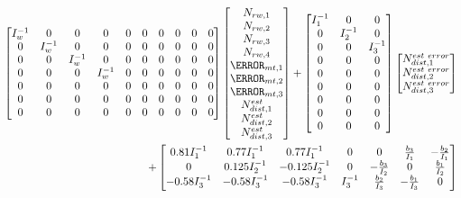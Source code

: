 \begin{align}
\begin{bmatrix}
I_w^{-1} & 0 & 0& 0 & 0 & 0 & 0 & 0 & 0 & 0 \\
0 & I_w^{-1} & 0& 0 & 0 & 0 & 0 & 0 & 0 & 0 \\ 
0 & 0 & I_w^{-1} & 0 & 0 & 0 & 0 & 0 & 0 & 0\\  
0 & 0 & 0 &  I_w^{-1} & 0& 0 & 0 & 0 & 0 & 0\\
0 & 0 & 0 & 0 & 0& 0 & 0 & 0 & 0 & 0\\
0 & 0 & 0 & 0 & 0& 0 & 0 & 0 & 0 & 0\\
0 & 0 & 0 & 0 & 0& 0 & 0 & 0 & 0 & 0
\end{bmatrix}
\begin{bmatrix}
N_{rw,1} \\
N_{rw,2} \\
N_{rw,3}\\
N_{rw,4}\\
\m_{mt,1} \\
\m_{mt,2} \\
\m_{mt,3} \\
N^{est}_{dist,1} \\
N^{est}_{dist,2} \\
N^{est}_{dist,3}
\end{bmatrix}
+
\begin{bmatrix}
I_1^{-1} & 0 & 0 \\
0 & I_2^{-1} & 0 \\
0 & 0 & I_3^{-1}\\
0 & 0 & 0 \\
0 & 0 & 0 \\
0 & 0 & 0 \\
0 & 0 & 0 \\
0 & 0 & 0 \\
0 & 0 & 0 
\end{bmatrix}
\begin{bmatrix}
N^{est \ error}_{dist,1} \\
N^{est \ error}_{dist,2} \\
N^{est \ error}_{dist,3}\\
\end{bmatrix}
 \\
 + 
 \begin{bmatrix}
0.81I_1^{-1} & 0.77I_1^{-1} & 0.77I_1^{-1} & 0 & 0 & \frac{b_3}{I_1} & -\frac{b_2}{I_1}\\
0 & 0.125I_2^{-1} & -0.125I_2^{-1} & 0 & - \frac{b_3}{I_2} & 0 &  \frac{b_1}{I_2} \\ 
 -0.58I_3^{-1} & -0.58 I_3^{-1} & -0.58 I_3^{-1} & I_3^{-1} &  \frac{b_2}{I_3} &  -\frac{b_1}{I_3} & 0 \\  

\end{bmatrix}
\end{align}
